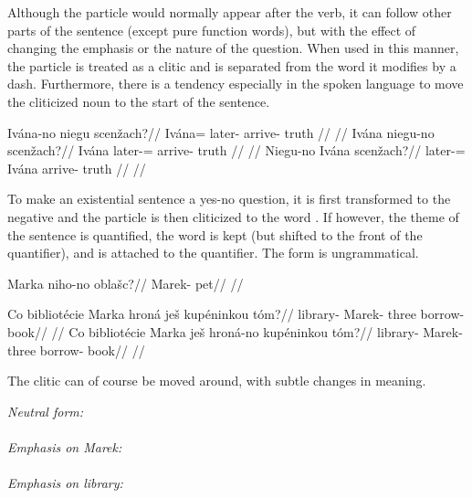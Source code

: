 Although the particle  would normally appear after the verb, it can follow other parts of the sentence (except pure function words), but with the effect of changing the emphasis or the nature of the question. When used in this manner, the particle is treated as a clitic and is separated from the word it modifies by a dash. Furthermore, there is a tendency especially in the spoken language to move the cliticized noun to the start of the sentence.

\pex
\a
\begingl
\gla Iv\'ana-no niegu scen\v{z}ach?//
\glb Iv\'ana= later- arrive- truth //
\glft {}//
\endgl
\a
\begingl
\gla Iv\'ana niegu-no scen\v{z}ach?//
\glb Iv\'ana later-= arrive- truth //
\glft {}//
\endgl
\a
\begingl
\gla Niegu-no Iv\'ana scen\v{z}ach?//
\glb later-= Iv\'ana arrive- truth //
\glft {}//
\endgl
\xe

To make an existential sentence a yes-no question, it is first transformed to the negative and the particle  is then cliticized to the word . If however, the theme of the sentence is quantified, the word  is kept (but shifted to the front of the quantifier), and  is attached to the quantifier. The form  is ungrammatical.

\pex
\begingl
\gla Marka niho-no obla\v{s}c?//
\glb Marek-  pet//
\glft {}//
\endgl
\xe

\pex
\a
\begingl
\gla Co bibliot\'ecie Marka hron\'a je\v{s} kup\'eninkou t\'om?//
\glb {} library- Marek- three  borrow- book//
\glft {}//
\endgl
\a
\begingl
\gla Co bibliot\'ecie Marka je\v{s} hron\'a-no kup\'eninkou t\'om?//
\glb {} library- Marek-  three borrow- book//
\glft {}//
\endgl
\xe

The clitic  can of course be moved around, with subtle changes in meaning.

\pex
\a \emph{Neutral form:}\\
\\
\a \emph{Emphasis on \emph{Marek:}}\\
\\
\a \emph{Emphasis on \emph{library:}}\\
\\
\xe

